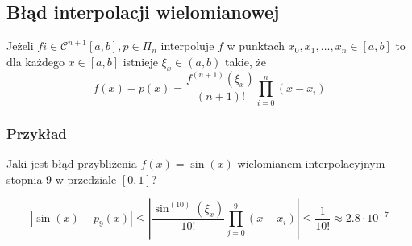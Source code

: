 \documentclass[../mn-notatki.tex]{subfiles}
\begin{document}




\subsection{Błąd interpolacji wielomianowej}
\begin{tcolorbox}
Jeżeli $f i\in \mathcal{C}^{n+1}[a,b], p \in \Pi_n$ interpoluje $f$ w punktach
$x_0, x_1, \ldots, x_n \in [a,b]$ to dla każdego $x \in [a,b]$ istnieje
$\xi_x \in (a,b)$ takie, że
\[
f(x) - p(x) = \frac{f^{(n+1)}(\xi_x)}{(n+1)!} \prod_{i=0}^{n} (x-x_i)
\]
\end{tcolorbox}

\subsubsection{Przykład}

Jaki jest błąd przybliżenia $f(x) = \sin(x)$ wielomianem interpolacyjnym
stopnia $9$ w przedziale $[0,1]$?

\[
|\sin(x) - p_9(x)| \leqslant
\left| \frac{\sin^{(10)}(\xi_x)}{10!} \prod_{j=0}^{9} (x-x_i) \right|
\leqslant \frac{1}{10!} \approx 2.8 \cdot 10^{-7}
\]
\end{document}
